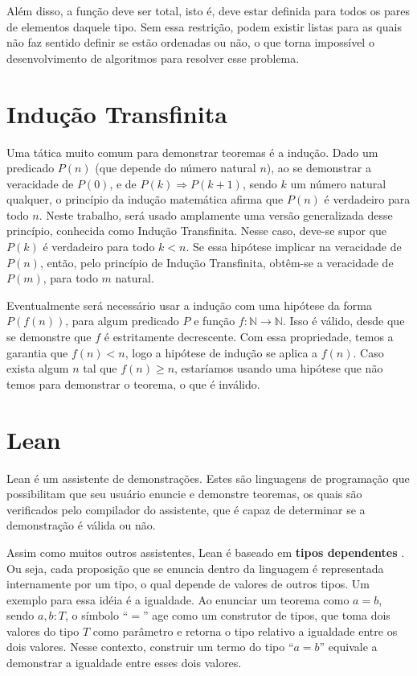 \documentclass[12pt, oneside, a4paper,english,brazil]{abntex2}
\begin{document}
\qquad Al\'em disso, a fun\c{c}\~ao deve ser total, isto \'e, deve estar definida para todos os pares de
elementos daquele tipo. Sem essa restri\c{c}\~ao, podem existir listas para as quais n\~ao faz sentido
definir se est\~ao ordenadas ou n\~ao, o que torna imposs\'ivel o desenvolvimento de algoritmos para resolver
esse problema.

\section{Indu\c{c}\~ao Transfinita}

\qquad Uma t\'atica muito comum para demonstrar teoremas \'e a indu\c{c}\~ao. Dado um predicado $P(n)$ (que
depende do n\'umero natural $n$), ao se demonstrar a veracidade de $P(0)$, e de $P(k) \Rightarrow P(k + 1)$,
sendo $k$ um n\'umero natural qualquer, o princ\'ipio da indu\c{c}\~ao matem\'atica afirma que $P(n)$ \'e
verdadeiro para todo $n$. Neste trabalho, ser\'a usado amplamente uma vers\~ao generalizada desse
princ\'ipio, conhecida como Indu\c{c}\~ao Transfinita. Nesse caso, deve-se supor que $P(k)$ \'e verdadeiro
para todo $k < n$. Se essa hip\'otese implicar na veracidade de $P(n)$, ent\~ao, pelo princ\'ipio de
Indu\c{c}\~ao Transfinita, obt\^em-se a veracidade de $P(m)$, para todo $m$ natural.

\qquad Eventualmente ser\'a necess\'ario usar a indu\c{c}\~ao com uma hip\'otese da forma $P(f(n))$, para
algum predicado $P$ e fun\c{c}\~ao $f : \mathbb{N} \rightarrow \mathbb{N}$. Isso \'e v\'alido, desde que se
demonstre que $f$ \'e estritamente decrescente. Com essa propriedade, temos a garantia que $f(n) < n$,
logo a hip\'otese de indu\c{c}\~ao se aplica a $f(n)$. Caso exista algum $n$ tal que $f(n) \geq n$,
estar\'iamos usando uma hip\'otese que n\~ao temos para demonstrar o teorema, o que \'e inv\'alido.

\section{Lean}

\qquad Lean \cite{2} \'e um assistente de demonstra\c{c}\~oes. Estes s\~ao linguagens de programa\c{c}\~ao que
possibilitam que seu usu\'ario enuncie e demonstre teoremas, os quais s\~ao verificados pelo compilador do
assistente, que \'e capaz de determinar se a demonstra\c{c}\~ao \'e v\'alida ou n\~ao.

\qquad Assim como muitos outros assistentes, Lean \'e baseado em \textbf{tipos
  dependentes} \cite{typesAtWork}. Ou seja, cada proposi\c{c}\~ao que se enuncia dentro da linguagem \'e
representada internamente por um tipo, o qual depende de valores de outros tipos. Um exemplo para essa
id\'eia \'e a igualdade. Ao enunciar um teorema como $a = b$, sendo $a, b : T$, o s\'imbolo ``$=$'' age como
um construtor de tipos, que toma dois valores do tipo $T$ como par\^ametro e retorna o tipo relativo a
igualdade entre os dois valores. Nesse contexto, construir um termo do tipo ``$a = b$'' equivale a demonstrar
a igualdade entre esses dois valores.
\end{document}
